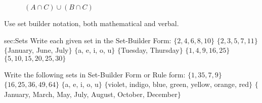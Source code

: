 \begin{figure}[h]
\centering
\def\firstcircle{(90:1.75cm) circle (2.5cm)}
  \def\secondcircle{(210:1.75cm) circle (2.5cm)}
  \def\thirdcircle{(330:1.75cm) circle (2.5cm)}
\caption[Venn]{$(A \cap C) \cup (B \cap C)$}
\end{figure}

\newpage

Use set builder notation, both mathematical and verbal.
\begin{exercises}{sec:Sets}
\prob[AASet1] Write each given set in the Set-Builder Form:
\subprob $\{2, 4, 6, 8, 10\}$
\subprob $\{2, 3, 5, 7, 11\}$
\subprob $\{$January, June, July$\}$
\subprob $\{$a, e, i, o, u$\}$
\subprob $\{$Tuesday, Thursday$\}$
\subprob $\{1, 4, 9, 16, 25\}$
\subprob $\{5, 10, 15, 20, 25, 30\}$



\prob[AASet2] Write the following sets in Set-Builder Form or Rule form:
\subprob $\{1, 3 5, 7, 9\}$
\subprob $\{16, 25, 36, 49, 64\}$
\subprob $\{$a, e, i, o, u$\}$
\subprob $\{$violet, indigo, blue, green, yellow, orange, red$\}$
\subprob $\{$January, March, May, July, August, October, December$\}$

 

\end{exercises}



